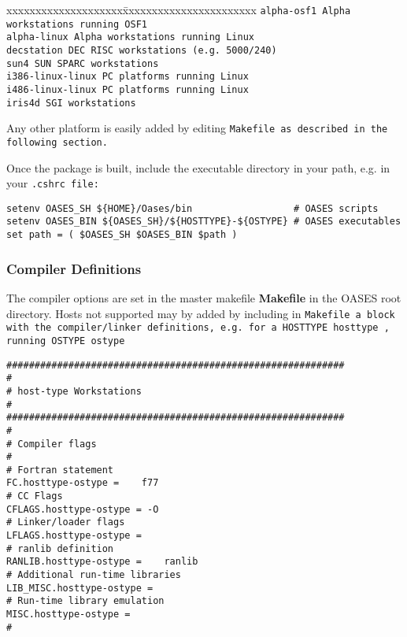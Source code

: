 \begin{tabbing}
xxxxxxxxxxxxxxxxxxxx\= xxxxxxxxxxxxxxxxxxxxxxx \kill 
\tt alpha-osf1 \rm \> Alpha workstations running OSF1\\
\tt alpha-linux \rm \> Alpha workstations running Linux\\
\tt decstation \rm \> DEC RISC workstations (e.g. 5000/240) \\
\tt sun4 \rm \> SUN SPARC workstations \\
\tt i386-linux-linux \> PC platforms running Linux \\
\tt i486-linux-linux \> PC platforms running Linux \\
\tt iris4d \rm \> SGI workstations 
\end{tabbing} 		

\noindent Any other platform is easily added by editing \tt Makefile
\rm as
described in the following section.


Once the package is built, include the executable directory in your
path, e.g. in your \tt .cshrc \rm file:

\begin{verbatim}
setenv OASES_SH ${HOME}/Oases/bin                  # OASES scripts
setenv OASES_BIN ${OASES_SH}/${HOSTTYPE}-${OSTYPE} # OASES executables
set path = ( $OASES_SH $OASES_BIN $path ) 
\end{verbatim}

\subsubsection{Compiler Definitions}

The compiler options are set in the master makefile {\bf Makefile} in
the OASES root directory. Hosts not supported may by added
by including in \tt Makefile \rm a block with the compiler/linker 
definitions, e.g. for a \tt HOSTTYPE hosttype \rm, running 
\tt OSTYPE ostype \rm

\begin{verbatim}
############################################################
#
# host-type Workstations
#
############################################################
#
# Compiler flags
#
# Fortran statement
FC.hosttype-ostype =	f77
# CC Flags
CFLAGS.hosttype-ostype = -O
# Linker/loader flags 
LFLAGS.hosttype-ostype =
# ranlib definition 
RANLIB.hosttype-ostype =	ranlib
# Additional run-time libraries
LIB_MISC.hosttype-ostype = 	
# Run-time library emulation
MISC.hosttype-ostype = 
#
\end{verbatim}



